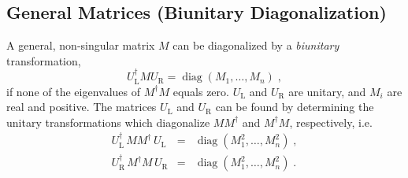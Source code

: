 \documentclass[12pt,a4paper,twoside]{scrartcl}
\DeclareMathOperator{\diag}{diag}
\numberwithin{equation}{section}
\numberwithin{table}{section}
\begin{document}
\subsection*{General Matrices (Biunitary Diagonalization)}
\begin{Theorem} \label{th:BiunitaryDiag}
 A general, non-singular matrix $M$ can be diagonalized by a 
 \emph{biunitary} transformation,
 \begin{equation} \label{eq:BiunitaryDiag}
        U_\mathrm{L}^\dagger M U_\mathrm{R} = \diag(M_1,\dots,M_n) \;,
 \end{equation}
 if none of the eigenvalues of $M^\dagger M$ equals zero.
 $U_\mathrm{L}$ and $U_\mathrm{R}$ are unitary, and $M_i$ are real and
 positive.
 The matrices $U_\mathrm{L}$ and $U_\mathrm{R}$ can be found by
 determining the unitary transformations which diagonalize $M M^\dagger$
 and $M^\dagger M$, respectively, i.e.\
 \begin{subequations}
 \begin{eqnarray}
        U_\mathrm{L}^\dagger \, M M^\dagger \, U_\mathrm{L} &=&
         \diag(M_1^2,\dots,M_n^2) \;,
 \\
        U_\mathrm{R}^\dagger \, M^\dagger M \, U_\mathrm{R} &=&
         \diag(M_1^2,\dots,M_n^2) \;.
        \label{eq:DefUR}
 \end{eqnarray}
 \end{subequations}
\end{Theorem}
\end{document}
